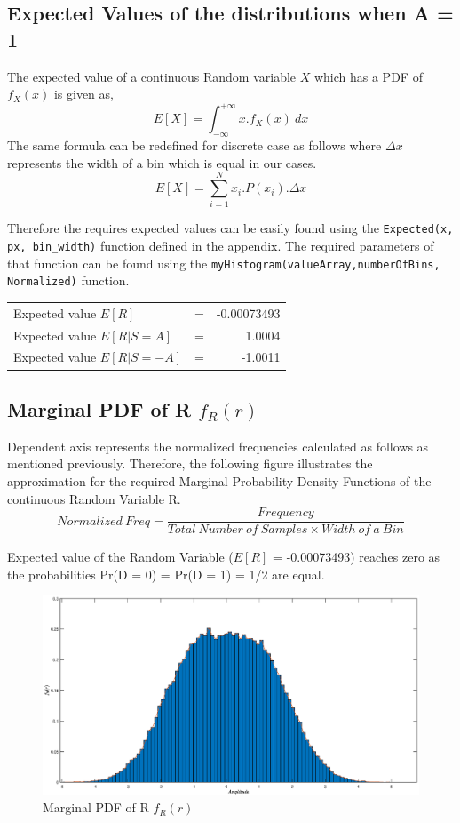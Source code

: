 \documentclass[a4paper,11pt]{article}%
\begin{document}
\subsection{Expected Values of the distributions when A = 1}

The expected value of a continuous Random variable $X$ which has a PDF of $f_X(x)$ is given as,
\[
E[X] = \int_{-\infty}^{+\infty} x.f_X(x) ~dx
\]
The same formula can be redefined for discrete case as follows where $\Delta x$ represents the width of a bin which is equal in our cases.
\[
E[X] = \sum_{i = 1}^{N} x_i.P(x_i).\Delta x
\]

Therefore the requires expected values can be easily found using the {\tt Expected(x, px, bin\_width)} function defined in the appendix. The required parameters of that function can be found using the {\tt myHistogram(valueArray,numberOfBins, Normalized)} function. \\

\begin{tabular}[!h]{l c r}
	Expected value $E[R]$& = & -0.00073493\\
Expected value $E[R|S=A]$ &=& 1.0004\\
Expected value $E[R|S=-A]$& =& -1.0011\\

\end{tabular}

\pagebreak
\subsection{Marginal PDF of R $f_R(r)$}
Dependent axis represents the normalized frequencies calculated as follows as mentioned previously. Therefore, the following figure illustrates the approximation for the required Marginal Probability Density Functions of the continuous Random Variable R.
\[
Normalized ~Freq = \frac{Frequency}{Total~Number~of~Samples \times Width~of~a~Bin}
\] 

Expected value of the Random Variable  ($E[R]$ = -0.00073493) reaches zero as the probabilities Pr(D = 0) = Pr(D = 1) = 1/2 are equal.

\begin{figure}[!h]
	\centering
	\includegraphics[scale=0.45]{figures/q5f9}
	\caption{Marginal PDF of R $f_R(r)$}
\end{figure}
\end{document}
